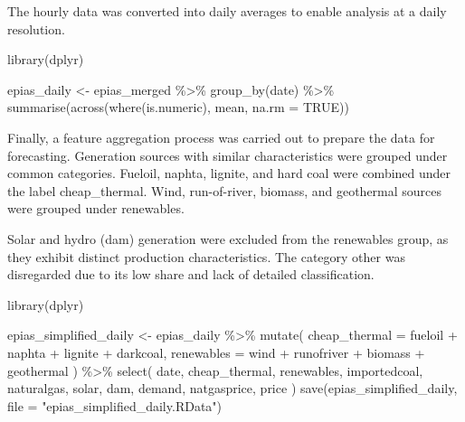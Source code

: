 \documentclass[
  11pt,
  a4paper,
]{article}
\newenvironment{Shaded}{\begin{snugshade}}{\end{snugshade}}
\newcommand{\AttributeTok}[1]{\textcolor[rgb]{0.40,0.45,0.13}{#1}}
\newcommand{\ConstantTok}[1]{\textcolor[rgb]{0.56,0.35,0.01}{#1}}
\newcommand{\FunctionTok}[1]{\textcolor[rgb]{0.28,0.35,0.67}{#1}}
\newcommand{\NormalTok}[1]{\textcolor[rgb]{0.00,0.23,0.31}{#1}}
\newcommand{\OtherTok}[1]{\textcolor[rgb]{0.00,0.23,0.31}{#1}}
\newcommand{\SpecialCharTok}[1]{\textcolor[rgb]{0.37,0.37,0.37}{#1}}
\newcommand{\StringTok}[1]{\textcolor[rgb]{0.13,0.47,0.30}{#1}}
\begin{document}
The hourly data was converted into daily averages to enable analysis at
a daily resolution.

\begin{Shaded}
\begin{Highlighting}[]
\FunctionTok{library}\NormalTok{(dplyr)}

\NormalTok{epias\_daily }\OtherTok{\textless{}{-}}\NormalTok{ epias\_merged }\SpecialCharTok{\%\textgreater{}\%}
  \FunctionTok{group\_by}\NormalTok{(date) }\SpecialCharTok{\%\textgreater{}\%}
  \FunctionTok{summarise}\NormalTok{(}\FunctionTok{across}\NormalTok{(}\FunctionTok{where}\NormalTok{(is.numeric), mean, }\AttributeTok{na.rm =} \ConstantTok{TRUE}\NormalTok{))}
\end{Highlighting}
\end{Shaded}

Finally, a feature aggregation process was carried out to prepare the
data for forecasting. Generation sources with similar characteristics
were grouped under common categories. Fueloil, naphta, lignite, and hard
coal were combined under the label cheap\_thermal. Wind, run-of-river,
biomass, and geothermal sources were grouped under renewables.

Solar and hydro (dam) generation were excluded from the renewables
group, as they exhibit distinct production characteristics. The category
other was disregarded due to its low share and lack of detailed
classification.

\begin{Shaded}
\begin{Highlighting}[]
\FunctionTok{library}\NormalTok{(dplyr)}

\NormalTok{epias\_simplified\_daily }\OtherTok{\textless{}{-}}\NormalTok{ epias\_daily }\SpecialCharTok{\%\textgreater{}\%}
  \FunctionTok{mutate}\NormalTok{(}
    \AttributeTok{cheap\_thermal =}\NormalTok{ fueloil }\SpecialCharTok{+}\NormalTok{ naphta }\SpecialCharTok{+}\NormalTok{ lignite }\SpecialCharTok{+}\NormalTok{ darkcoal,}
    \AttributeTok{renewables =}\NormalTok{ wind }\SpecialCharTok{+}\NormalTok{ runofriver }\SpecialCharTok{+}\NormalTok{ biomass }\SpecialCharTok{+}\NormalTok{ geothermal}
\NormalTok{  ) }\SpecialCharTok{\%\textgreater{}\%}
  \FunctionTok{select}\NormalTok{(}
\NormalTok{    date, cheap\_thermal, renewables,}
\NormalTok{    importedcoal, naturalgas, solar, dam, demand, natgasprice, price}
\NormalTok{  )}
\FunctionTok{save}\NormalTok{(epias\_simplified\_daily, }\AttributeTok{file =} \StringTok{"epias\_simplified\_daily.RData"}\NormalTok{)}
\end{Highlighting}
\end{Shaded}
\end{document}
